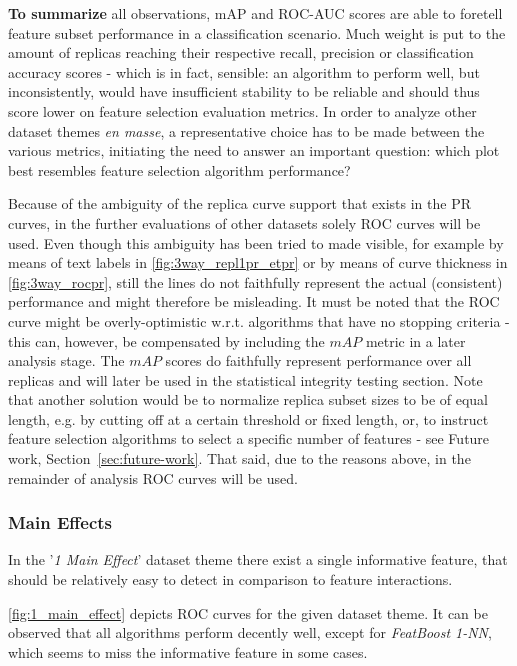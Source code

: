\documentclass{article}
\begin{document}
\textbf{To summarize} all observations, mAP and ROC-AUC scores are able to foretell feature subset performance in a classification scenario. Much weight is put to the amount of replicas reaching their respective recall, precision or classification accuracy scores - which is in fact, sensible: an algorithm to perform well, but inconsistently, would have insufficient stability to be reliable and should thus score lower on feature selection evaluation metrics. In order to analyze other dataset themes \textit{en masse}, a representative choice has to be made between the various metrics, initiating the need to answer an important question: which plot best resembles feature selection algorithm performance?

Because of the ambiguity of the replica curve support that exists in the PR curves, in the further evaluations of other datasets solely ROC curves will be used. Even though this ambiguity has been tried to made visible, for example by means of text labels in \autoref{fig:3way_repl1pr_etpr} or by means of curve thickness in \autoref{fig:3way_rocpr}, still the lines do not faithfully represent the actual (consistent) performance and might therefore be misleading. It must be noted that the ROC curve might be overly-optimistic w.r.t. algorithms that have no stopping criteria - this can, however, be compensated by including the $mAP$ metric in a later analysis stage. The $mAP$ scores do faithfully represent performance over all replicas and will later be used in the statistical integrity testing section. Note that another solution would be to normalize replica subset sizes to be of equal length, e.g. by cutting off at a certain threshold or fixed length, or, to instruct feature selection algorithms to select a specific number of features - see Future work, Section~\ref{sec:future-work}. That said, due to the reasons above, in the remainder of analysis ROC curves will be used.

\subsubsection{Main Effects}
In the '\textit{1 Main Effect}' dataset theme there exist a single informative feature, that should be relatively easy to detect in comparison to feature interactions.

\autoref{fig:1_main_effect} depicts ROC curves for the given dataset theme. It can be observed that all algorithms perform decently well, except for \textit{FeatBoost 1-NN}, which seems to miss the informative feature in some cases.
\end{document}
